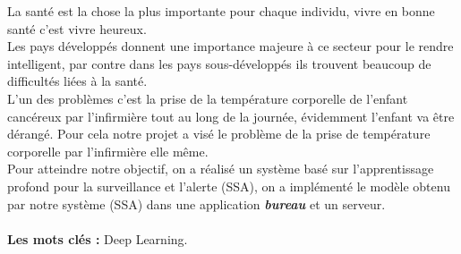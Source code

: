 \documentclass[12pt]{article}
\begin{document}
\begin{resume}
	La sant\'e est la chose la plus importante pour chaque individu, vivre en bonne sant\' e c'est vivre heureux.\\
	Les pays d\'evelopp\'es donnent une importance majeure \`a ce secteur pour le rendre intelligent, par contre dans les pays sous-d\' evelopp\' es ils trouvent beaucoup de difficult\' es li\'ees \`a la sant\'e. \\
	
	L'un des probl\`emes c'est la prise de la temp\' erature corporelle de l'enfant canc\' ereux par l'infirmi\`ere tout au long de la journ\' ee, \' evidemment l'enfant va \^ etre d\' erang\' e. Pour cela notre projet a vis\' e le probl\`eme de la prise de temp\' erature corporelle par l'infirmi\`ere elle m\^ eme.\\



	
	Pour atteindre notre  objectif, on a r\' ealis\' e  un syst\` eme bas\' e sur  l'apprentissage  profond pour  la surveillance et l'alerte (SSA), on a impl\' ement\' e le mod\` ele obtenu par notre syst\` eme (SSA) dans une application \textit{\textbf{bureau}} et un serveur.\\ \\

\textbf{Les mots cl\' es :} Deep Learning.
\end{resume}
\end{document}
